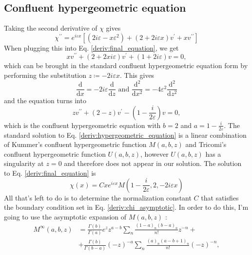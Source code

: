 \subsection{Confluent hypergeometric equation}
Taking the second derivative of \(\chi \) gives
\begin{equation}
	\chi ^{\prime\prime} = e^{i\varepsilon x} \left[ (2i\varepsilon - x \varepsilon ^2) + (2 + 2 i \varepsilon x ) v^{\prime} + x v^{\prime\prime}   \right] 
\end{equation}
When plugging this into Eq. \eqref{deriv:final_equation}, we get
\begin{equation}
	x v^{\prime\prime} + (2 + 2 x i \varepsilon ) v^{\prime} + (1 + 2i \varepsilon ) v = 0,
\end{equation}
which can be brought in the standard confluent hypergeometric equation form by performing the substitution \(z \coloneqq - 2i \varepsilon x\). This gives
\begin{equation}
	\frac{\mathrm{d}}{\mathrm{d}x} = - 2 i \varepsilon \frac{\mathrm{d}}{\mathrm{d}z} 
	\text{ and } 
	\frac{\mathrm{d}^2}{\mathrm{d}x^2} = - 4 \varepsilon ^2 \frac{\mathrm{d}^2}{\mathrm{d}z^2} 
\end{equation}
and the equation turns into
\begin{equation}\label{deriv:hypergeometric_equation}
	z v^{\prime\prime} + (2-z) v^{\prime} - \left( 1- \frac{i}{2\varepsilon } \right) v = 0,
\end{equation}
which is the confluent hypergeometric equation with \(b=2\) and \(a=1- \frac{i}{2\varepsilon }\).
The standard solution to Eq. \eqref{deriv:hypergeometric_equation} is a linear combination of Kummer's confluent hypergeometric function \(M(a,b,z)\) and Tricomi's confluent hypergeometric function \(U(a,b,z)\), however \(U(a,b,z)\) has a singularity at \(z=0\) and therefore does not appear in our solution. The solution to Eq. \eqref{deriv:final_equation} is
\begin{equation}
	\chi (x) = Cxe^{i\varepsilon x} M\left(1-\frac{i}{2\varepsilon }, 2, -2i\varepsilon x\right)
\end{equation}
All that's left to do is to determine the normalization constant \(C\) that satisfies the boundary condition set in Eq. \eqref{deriv:chi_asymptotic}. In order to do this, I'm going to use the asymptotic expansion of \(M(a,b,z)\) \cite{DLMF}:
\begin{align}
	M^{\infty} (a,b,z)&= 
	\frac{\Gamma (b)}{\Gamma (a)} e^z z^{a-b} \sum_{n} \frac{(1-a)_n (b-a)_n}{n!}z^{-n} +\\
	&+ \frac{\Gamma (b)}{\Gamma (b-a)}(-z)^{-a} \sum_{n} \frac{(a)_n(a-b+1)_n}{n!}(-z)^{-n},
\end{align}
